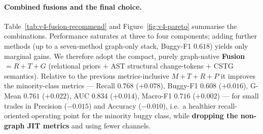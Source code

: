 \documentclass[11pt,a4paper]{article}
\begin{document}
	\begin{table}[t]
	\centering \small
	\caption{Single inference methods on the final graph (Core+AST+CSTG, no X), seven
	headline metrics, ranked by Buggy-F1. CSTG ($G$) is the strongest single channel;
	the non-graph JIT metrics ($M$) are near the weakest.}
	\label{tab:v4-fusion-singles}
	\end{table}

	\paragraph{Combined fusions and the final choice.}
	Table~\ref{tab:v4-fusion-recommend} and Figure~\ref{fig:v4-pareto} summarise the
	combinations. Performance saturates at three to four components; adding further
	methods (up to a seven-method graph-only stack, Buggy-F1 $0.618$) yields only
	marginal gains. We therefore adopt the compact, purely graph-native
	\textbf{Fusion $=R+T+G$} (relational priors $+$ AST structural change-tokens $+$
	CSTG semantics). Relative to the previous metrics-inclusive $M{+}T{+}R{+}P$ it
	improves the minority-class metrics --- Recall $0.768$ ($+0.078$), Buggy-F1
	$0.608$ ($+0.016$), G-Mean $0.761$ ($+0.022$), AUC $0.834$ ($+0.014$), Macro-F1
	$0.716$ ($+0.002$) --- for small trades in Precision ($-0.015$) and Accuracy
	($-0.010$), i.e.\ a healthier recall-oriented operating point for the minority
	buggy class, while \textbf{dropping the non-graph JIT metrics} and using fewer
	channels.
\end{document}
